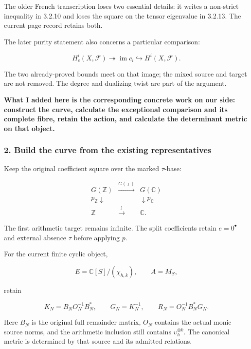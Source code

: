 The older French transcription loses two essential details: it writes a non-strict inequality in 3.2.10 and loses the square on the tensor eigenvalue in 3.2.13. The current page record retains both.

The later purity statement also concerns a particular comparison:

\[
H_c^i(X,\mathcal F)
\twoheadrightarrow
\operatorname{im}c_i
\hookrightarrow
H^i(X,\mathcal F).
\]

The two already-proved bounds meet on that image; the mixed source and target are not removed. The degree and dualizing twist are part of the argument.

\textbf{What I added here is the corresponding concrete work on our side: construct the curve, calculate the exceptional comparison and its complete fibre, retain the action, and calculate the determinant metric on that object.}

\subsubsection{2. Build the curve from the existing representatives}\label{endpoint-curvature_original--build-the-curve-from-the-existing-representatives}

Keep the original coefficient square over the marked \(\tau\)-base:

\[
\boxed{
\begin{array}{ccc}
G(\mathbb Z)&\xrightarrow{G(\jmath)}&G(\mathbb C)\\
p_{\mathbb Z}\downarrow&&\downarrow p_{\mathbb C}\\
\mathbb Z&\xrightarrow{\jmath}&\mathbb C.
\end{array}
}
\]

The first arithmetic target remains infinite. The split coefficients retain \(e=0^\bullet\) and external absence \(\tau\) before applying \(p\).

For the current finite cyclic object,

\[
E=\mathbb C[S]/(\chi_{h,k}),\qquad A=M_S,
\]

retain

\[
K_N=B_NO_N^{-1}B_N^*,\qquad
G_N=K_N^{-1},\qquad
R_N=O_N^{-1}B_N^*G_N.
\]

Here \(B_N\) is the original full remainder matrix, \(O_N\) contains the actual monic source norms, and the arithmetic inclusion still contains \(\upsilon_h^{\otimes k}\). The canonical metric is determined by that source and its admitted relations.

